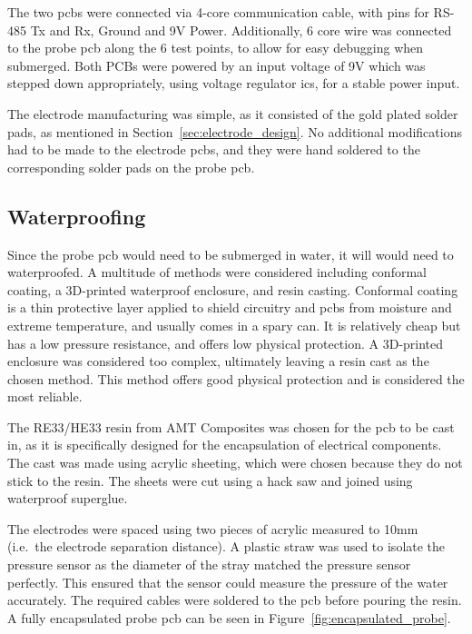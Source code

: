 \hfill \break

The two \gls{pcb}s were connected via 4-core communication cable, with pins for RS-485 Tx and Rx, Ground and 9V Power.
Additionally, 6 core wire was connected to the probe \gls{pcb} along the 6 test points, to allow for easy debugging when submerged.
Both PCBs were powered by an input voltage of 9V which was stepped down appropriately, using voltage regulator \gls{ic}s, for a stable power input.

The electrode manufacturing was simple, as it consisted of the gold plated solder pads, as mentioned in Section~\ref{sec:electrode_design}.
No additional modifications had to be made to the electrode \gls{pcb}s, and they were hand soldered to the corresponding solder pads on the probe \gls{pcb}.

\subsection{Waterproofing}\label{sec:waterproofing}
Since the probe \gls{pcb} would need to be submerged in water, it will would need to waterproofed.
A multitude of methods were considered including conformal coating, a 3D-printed waterproof enclosure, and resin casting.
Conformal coating is a thin protective layer applied to shield circuitry and \gls{pcb}s from moisture and extreme temperature, and usually comes in a spary can.
It is relatively cheap but has a low pressure resistance, and offers low physical protection.
A 3D-printed enclosure was considered too complex, ultimately leaving a resin cast as the chosen method.
This method offers good physical protection and is considered the most reliable.

The RE33/HE33 resin from AMT Composites was chosen for the \gls{pcb} to be cast in, as it is specifically designed for the encapsulation of electrical components.
The cast was made using acrylic sheeting, which were chosen because they do not stick to the resin.
The sheets were cut using a hack saw and joined using waterproof superglue.

The electrodes were spaced using two pieces of acrylic measured to 10mm (i.e.~the electrode separation distance).
A plastic straw was used to isolate the pressure sensor as the diameter of the stray matched the pressure sensor perfectly.
This ensured that the sensor could measure the pressure of the water accurately.
The required cables were soldered to the \gls{pcb} before pouring the resin.
A fully encapsulated probe \gls{pcb} can be seen in Figure~\ref{fig:encapsulated_probe}.

